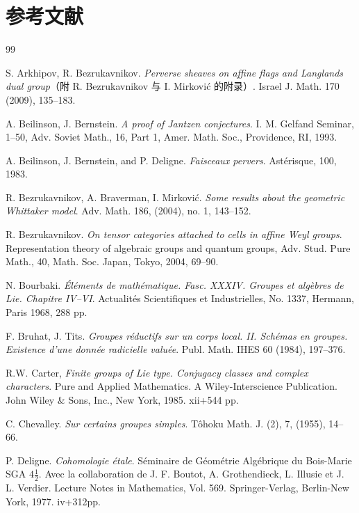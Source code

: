 
\section*{参考文献}

\begin{thebibliography}{99}\small

 S. Arkhipov, R. Bezrukavnikov. \emph{Perverse sheaves on affine flags and Langlands dual group}（附 R. Bezrukavnikov 与 I. Mirković 的附录）. Israel J. Math. 170 (2009), 135--183.

 A. Beilinson, J. Bernstein. \emph{A proof of Jantzen conjectures}. I. M. Gelfand Seminar, 1--50, Adv. Soviet Math., 16, Part 1, Amer. Math. Soc., Providence, RI, 1993.

 A. Beilinson, J. Bernstein, and P. Deligne. \emph{Faisceaux pervers}. Astérisque, 100, 1983.

 R. Bezrukavnikov, A. Braverman, I. Mirković. \emph{Some results about the geometric Whittaker model}. Adv. Math. 186, (2004), no. 1, 143--152.

 R. Bezrukavnikov. \emph{On tensor categories attached to cells in affine Weyl groups}. Representation theory of algebraic groups and quantum groups, Adv. Stud. Pure Math., 40, Math. Soc. Japan, Tokyo, 2004, 69--90.

 N. Bourbaki. \emph{Éléments de mathématique. Fasc. X\mbox{}XXIV. Groupes et algèbres de Lie. Chapitre IV--VI}. Actualités Scientifiques et Industrielles, No. 1337, Hermann, Paris 1968, 288 pp.

 F. Bruhat, J. Tits. \emph{Groupes réductifs sur un corps local. II. Schémas en groupes. Existence d'une donnée radicielle valuée}. Publ. Math. IHES 60 (1984), 197--376.

 R.W. Carter, \emph{Finite groups of Lie type. Conjugacy classes and complex characters}. Pure and Applied Mathematics. A Wiley-Interscience Publication. John Wiley \& Sons, Inc., New York, 1985. xii+544 pp.

 C. Chevalley. \emph{Sur certains groupes simples}. Tôhoku Math. J. (2), 7, (1955), 14--66.

 P. Deligne. \emph{Cohomologie étale}. Séminaire de Géométrie Algébrique du Bois-Marie SGA $4\frac{1}{2}$. Avec la collaboration de J. F. Boutot, A. Grothendieck, L. Illusie et J. L. Verdier. Lecture Notes in Mathematics, Vol. 569. Springer-Verlag, Berlin-New York, 1977. iv+312pp.


\end{thebibliography}
